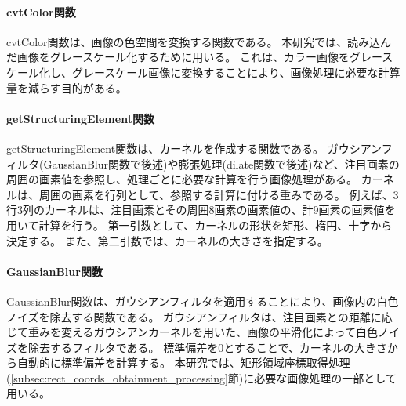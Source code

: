 \paragraph{cvtColor関数}
cvtColor関数は、画像の色空間を変換する関数である。
本研究では、読み込んだ画像をグレースケール化するために用いる。
これは、カラー画像をグレースケール化し、グレースケール画像に変換することにより、画像処理に必要な計算量を減らす目的がある。

\paragraph{getStructuringElement関数}
getStructuringElement関数は、カーネルを作成する関数である。
ガウシアンフィルタ(GaussianBlur関数で後述)や膨張処理(dilate関数で後述)など、注目画素の周囲の画素値を参照し、処理ごとに必要な計算を行う画像処理がある。
カーネルは、周囲の画素を行列として、参照する計算に付ける重みである。
例えば、3行3列のカーネルは、注目画素とその周囲8画素の画素値の、計9画素の画素値を用いて計算を行う。
第一引数として、カーネルの形状を矩形、楕円、十字から決定する。
また、第二引数では、カーネルの大きさを指定する。

\paragraph{GaussianBlur関数}
GaussianBlur関数は、ガウシアンフィルタを適用することにより、画像内の白色ノイズを除去する関数である。
ガウシアンフィルタは、注目画素との距離に応じて重みを変えるガウシアンカーネルを用いた、画像の平滑化によって白色ノイズを除去するフィルタである。
標準偏差を0とすることで、カーネルの大きさから自動的に標準偏差を計算する\cite{ガウシアンフィルタ}。
本研究では、矩形領域座標取得処理(\ref{subsec:rect_coords_obtainment_processing}節)に必要な画像処理の一部として用いる。

